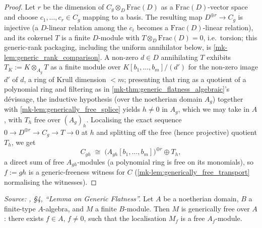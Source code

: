 \begin{proof}
  Let \(r\) be the dimension of \(C_g \otimes_D \mathrm{Frac}(D)\) as a
  \(\mathrm{Frac}(D)\)-vector space and choose \(c_1, \dots, c_r \in C_g\)
  mapping to a basis.  The resulting map \(D^{\oplus r} \to C_g\) is injective
  (a \(D\)-linear relation among the \(c_i\) becomes a
  \(\mathrm{Frac}(D)\)-linear relation), and its cokernel \(T\) is a finite
  \(D\)-module with \(T \otimes_D \mathrm{Frac}(D) = 0\), i.e.\ torsion;
  this generic-rank packaging, including the uniform annihilator below, is
  \ref{mk-lem:generic_rank_comparison}.  A
  non-zero \(d \in D\) annihilating \(T\) exhibits
  \(T_K := K \otimes_{A_g} T\) as a finite module over
  \(K[b_1, \dots, b_m]/(d')\) for the non-zero image \(d'\) of \(d\), a ring of
  Krull dimension \(< m\); presenting that ring as a quotient of a polynomial
  ring and filtering as in \ref{mk-thm:generic_flatness_algebraic}'s dévissage,
  the inductive hypothesis (over the noetherian domain \(A_g\)) together with
  \ref{mk-lem:generically_free_splice} yields \(h \ne 0\) in \(A_g\), which we
  may take in \(A\), with \(T_h\) free over \((A_g)_h\).  Localising the exact
  sequence \(0 \to D^{\oplus r} \to C_g \to T \to 0\) at \(h\) and splitting
  off the free (hence projective) quotient \(T_h\), we get
  \[
    C_{gh} \;\cong\; \bigl(A_{gh}[b_1, \dots, b_m]\bigr)^{\oplus r} \oplus T_h ,
  \]
  a direct sum of free \(A_{gh}\)-modules (a polynomial ring is free on its
  monomials), so \(f := gh\) is a generic-freeness witness for \(C\)
  (\ref{mk-lem:generically_free_transport} normalising the witnesses).
\end{proof}

\begin{theorem}\label{mk-thm:generic_flatness_algebraic}
  \leanok

  \textit{Source: \cite{nitsure-hilbert-quot}, \S4, ``Lemma on Generic Flatness''.}
  Let \(A\) be a noetherian domain, \(B\) a finite-type \(A\)-algebra, and \(M\) a finite
  \(B\)-module. Then \(M\) is generically free over \(A\): there exists
  \(f \in A\), \(f \ne 0\), such that the localisation
  \(M_f\) is a free \(A_f\)-module.
\end{theorem}

